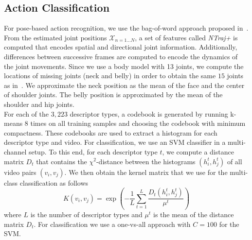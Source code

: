 \documentclass[a4paper, 10pt, conference]{ieeeconf}      \usepackage{FG2017}
\begin{document}
\subsection{Action Classification}
\label{sec:action_recognition}

For pose-based action recognition, we use the bag-of-word approach proposed in~\cite{Jhuang_iccv2013}. 
From the estimated joint positions $\mathcal{X}_{n=1 \dots N}$, a set of features called \emph{NTraj+} is computed that encodes spatial and directional joint information. Additionally, differences between successive frames are computed to encode the dynamics of the joint movements. Since we use a body model with 13 joints, we compute the locations of missing joints (neck and belly) in order to obtain the same $15$ joints as in~\cite{Jhuang_iccv2013}. We approximate the neck position as the mean of the face and the center of shoulder joints. The belly position is approximated by the mean of the shoulder and hip joints. \\
\indent For each of the $3,223$ descriptor types, a codebook is generated by running k-means $8$ times on all training samples and choosing the codebook with minimum compactness. These codebooks are used to extract a histogram for each descriptor type and video. 
For classification, we use an SVM classifier in a multi-channel setup. To this end, for each descriptor type $t$, we compute a distance matrix $D_t$ that contains the $\chi^{2}$-distance between the histograms $(h_{i}^{t},h_{j}^{t})$ of all video pairs $(v_i, v_j)$. We then obtain the kernel matrix that we use for the multi-class classification as follows 
\begin{equation}
K(v_i,v_j) = \exp \left( - \frac{1}{L} \sum^{L}_{t=1} \frac{D_t(h_{i}^{t},h_{j}^{t})}{\mu^{t}} \right)
\end{equation}
where $L$ is the number of descriptor types and $\mu^{t}$ is the mean of the distance matrix $D_t$. For classification we use a one-vs-all approach with $C = 100$ for the SVM.
\end{document}
